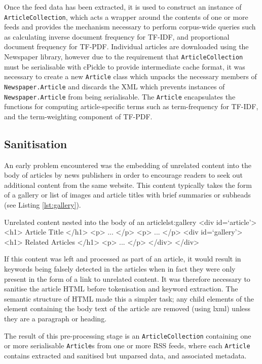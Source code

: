 Once the feed data has been extracted, it is used to construct an instance of \texttt{ArticleCollection}, which acts a wrapper around the contents of one or more feeds and provides the mechanism necessary to perform corpus-wide queries such as calculating inverse document frequency for TF-IDF, and proportional document frequency for TF-PDF. Individual articles are downloaded using the Newspaper library, however due to the requirement that \texttt{ArticleCollection} must be serialisable with cPickle to provide intermediate cache format, it was necessary to create a new \texttt{Article} class which unpacks the necessary members of \texttt{Newspaper.Article} and discards the XML which prevents instances of \texttt{Newspaper.Article} from being serialisable.  The \texttt{Article} encapsulates the functions for computing article-specific terms such as term-frequency for TF-IDF, and the term-weighting component of TF-PDF. 

\subsection{Sanitisation}

An early problem encountered was the embedding of unrelated content into the body of articles by news publishers in order to encourage readers to seek out additional content from the same website. This content typically takes the form of a gallery or list of images and article titles with brief summaries or subheads (see Listing \ref{lst:gallery}).

\begin{HTML}{Unrelated content nested into the body of an article}{lst:gallery}
<div id=`article'>
	<h1> Article Title </h1>
	<p> ... </p>
	<p> ... </p>
	<div id=`gallery'>
		<h1> Related Articles </h1>
		<p> ... </p>
	</div>
</div>	
\end{HTML}

If this content was left and processed as part of an article, it would result in keywords being falsely detected in the articles when in fact they were only present in the form of a link to unrelated content. It was therefore necessary to sanitise the article HTML before tokenisation and keyword extraction. The semantic structure of HTML made this a simpler task; any child elements of the element containing the body text of the article are removed (using lxml) unless they are a paragraph or heading.

The result of this pre-processing stage is an \texttt{ArticleCollection} containing one or more serialisable \texttt{Article}s from one or more RSS feeds, where each \texttt{Article} contains extracted and sanitised but unparsed data, and associated metadata.

